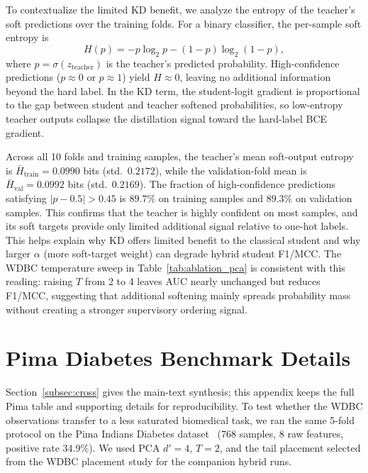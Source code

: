 \documentclass[11pt,a4paper]{article}
\begin{document}
To contextualize the limited KD benefit, we analyze the entropy of the teacher's soft predictions
over the training folds. For a binary classifier, the per-sample soft entropy is
\begin{equation}
H(p) = -p \log_2 p - (1-p) \log_2 (1-p),
\end{equation}
where $p = \sigma(z_{\text{teacher}})$ is the teacher's predicted probability. High-confidence
predictions ($p \approx 0$ or $p \approx 1$) yield $H \approx 0$, leaving no additional
information beyond the hard label. In the KD term, the student-logit gradient is proportional to the
gap between student and teacher softened probabilities, so low-entropy teacher outputs collapse the
distillation signal toward the hard-label BCE gradient.

Across all 10 folds and training samples, the teacher's mean soft-output entropy is
$\bar{H}_{\text{train}} = 0.0990$ bits (std.\ $0.2172$), while the validation-fold mean is
$\bar{H}_{\text{val}} = 0.0992$ bits (std.\ $0.2169$). The fraction of high-confidence
predictions satisfying $|p - 0.5| > 0.45$ is $89.7\%$ on training samples and $89.3\%$ on
validation samples. This confirms that the teacher is highly confident on most samples,
and its soft targets provide only limited additional signal relative to one-hot labels.
This helps explain why KD offers limited benefit to the classical student and why
larger $\alpha$ (more soft-target weight) can degrade hybrid student F1/MCC. The WDBC temperature
sweep in Table~\ref{tab:ablation_pca} is consistent with this reading: raising $T$ from 2 to 4
leaves AUC nearly unchanged but reduces F1/MCC, suggesting that additional softening mainly spreads
probability mass without creating a stronger supervisory ordering signal.

\section{Pima Diabetes Benchmark Details}
\label{app:pima}

Section~\ref{subsec:cross} gives the main-text synthesis; this appendix keeps the full Pima table
and supporting details for reproducibility. To test whether the WDBC observations transfer to a less
saturated biomedical task, we ran the
same 5-fold protocol on the Pima Indians Diabetes dataset~\cite{pima} (768 samples, 8 raw features, positive
rate 34.9\%). We used PCA $d'=4$, $T=2$, and the tail placement
selected from the WDBC placement study for the companion hybrid runs.
\end{document}
